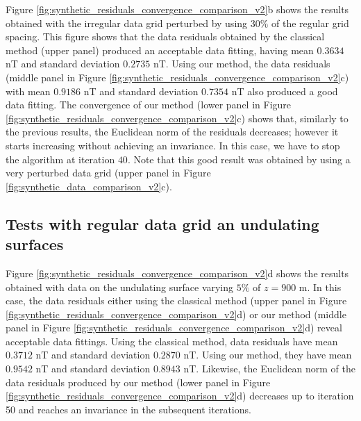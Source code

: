 \documentclass[manuscript]{geophysics}
\begin{document}
	Figure \ref{fig:synthetic_residuals_convergence_comparison_v2}b shows the results obtained
	with the irregular data grid perturbed by using $30\%$ of the regular grid spacing.
	This figure shows that the data residuals 
	obtained by the classical method (upper panel) produced an acceptable data fitting, having mean 
	$0.3634$ nT and standard deviation $0.2735$ nT. 
	Using our method, the data residuals (middle panel in Figure 
	\ref{fig:synthetic_residuals_convergence_comparison_v2}c) with mean $0.9186$ nT and 
	standard deviation $0.7354$ nT also produced a good data fitting.
	The convergence of our method (lower panel in Figure 
	\ref{fig:synthetic_residuals_convergence_comparison_v2}c) shows that, 
	similarly to the previous results, the Euclidean norm of the residuals decreases; however it starts
	increasing without achieving an invariance. In this case, we have to stop the algorithm
	at iteration $40$. Note that this good result was obtained by using a very perturbed
	data grid (upper panel in Figure \ref{fig:synthetic_data_comparison_v2}c).
	
	\subsection*{Tests with regular data grid an undulating surfaces}
	
	Figure \ref{fig:synthetic_residuals_convergence_comparison_v2}d shows the results obtained
	with data on the undulating surface varying $5\%$ of $z = 900$ m.
	In this case, the data residuals either using the classical method 
	(upper panel in Figure \ref{fig:synthetic_residuals_convergence_comparison_v2}d) or
	our method (middle panel in Figure \ref{fig:synthetic_residuals_convergence_comparison_v2}d) reveal
	acceptable data fittings.
	Using the classical method, data residuals have mean $0.3712$ nT and standard deviation $0.2870$ nT.
	Using our method, they have mean $0.9542$ nT and standard deviation $0.8943$ nT. 
	Likewise, the Euclidean norm of the data residuals produced by our method 
	(lower panel in Figure \ref{fig:synthetic_residuals_convergence_comparison_v2}d) decreases up to 
	iteration 50 and reaches an invariance in the subsequent iterations.
	
\end{document}

